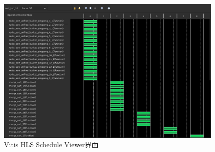 \begin{figure}[htbp]
    \centering
    \includegraphics[width=\linewidth]{figures/schedule_viewer.jpeg}
    \caption{Vitis HLS Schedule Viewer界面}
    \label{fig:schedule_viewer}
\end{figure}


